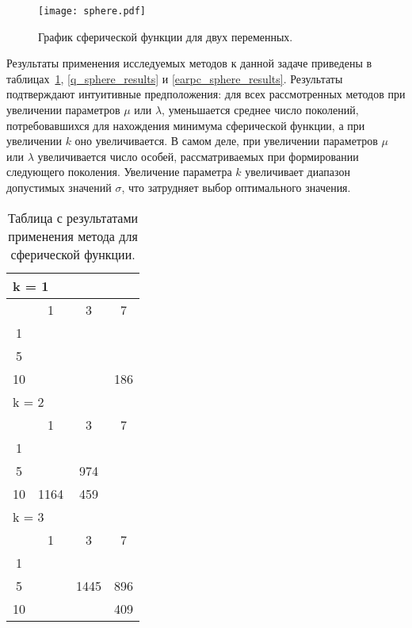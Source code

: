 \begin{figure}
    \centering
    \texttt{[image: sphere.pdf]}
    \caption{График сферической функции для двух переменных.}
    \label{sphere_plot}
\end{figure}

Результаты применения исследуемых методов к данной задаче приведены в таблицах~\ref{adaptive_sphere_results}, \ref{q_sphere_results} и \ref{earpc_sphere_results}. Результаты подтверждают интуитивные предположения: для всех рассмотренных методов при увеличении параметров $\mu$ или $\lambda$, уменьшается среднее число поколений, потребовавшихся для нахождения минимума сферической функции, а при увеличении $k$ оно увеличивается. В самом деле, при увеличении параметров $\mu$ или $\lambda$ увеличивается число особей, рассматриваемых при формировании следующего поколения. Увеличение параметра $k$ увеличивает диапазон допустимых значений $\sigma$, что затрудняет выбор оптимального значения.

\begin{table}
  \centering
    \begin{tabular}{|*4{c|}}
    \hline
    \multicolumn{4}{|l|}{k = 1} \\
    \hline
    \diagbox{$\mu$}{$\lambda$} & \multicolumn{1}{c|}{1} & \multicolumn{1}{c|}{3} & \multicolumn{1}{c|}{7} \\
    \hline
    1 & \cellcolor{olive}{2434} & \cellcolor{olive}{2207}& \cellcolor{olive}{878} \\
    \hline
    5 & \cellcolor{olive}{1450} & \cellcolor{olive}{569} & \cellcolor{olive}{368} \\
    \hline
    10 & \cellcolor{olive}{703} & \cellcolor{olive}{331} & 186 \\
    \hline
    \multicolumn{4}{|l|}{k = 2} \\
    \hline
    \diagbox{$\mu$}{$\lambda$} & \multicolumn{1}{c|}{1} & \multicolumn{1}{c|}{3} & \multicolumn{1}{c|}{7} \\
    \hline
    1 & \cellcolor{olive}{4342}& \cellcolor{olive}{2333}& \cellcolor{olive}{1464} \\
    \hline
    5 & \cellcolor{olive}{1891} & 974& \cellcolor{olive}{616} \\
    \hline
    10 & 1164 & 459& \cellcolor{olive}{188} \\
    \hline
    \multicolumn{4}{|l|}{k = 3} \\
    \hline
    \diagbox{$\mu$}{$\lambda$} & \multicolumn{1}{c|}{1} & \multicolumn{1}{c|}{3} & \multicolumn{1}{c|}{7} \\
    \hline
    1 & \cellcolor{olive}{8055}& \cellcolor{olive}{2826}& \cellcolor{olive}{1427} \\
    \hline
    5 & \cellcolor{olive}{2447} & 1445 & 896 \\
    \hline
    10 & \cellcolor{olive}{1996}& \cellcolor{olive}{1053} & 409 \\
  \hline
  \end{tabular}
  \captionsetup{justification=centering}
  \caption{Таблица с результатами применения метода  для сферической функции.}
  \label{adaptive_sphere_results}
\end{table}

